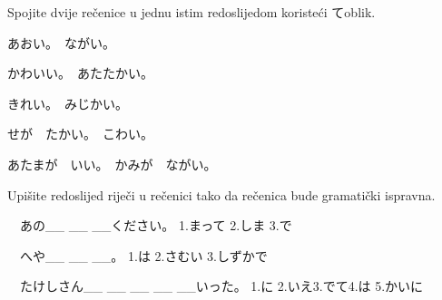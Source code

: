 

\author{Tomislav Mamić}	%


	
	
	\begin{mondai}{Spojite dvije rečenice u jednu istim redoslijedom koristeći てoblik.}
		\item あおい。　ながい。
		\item かわいい。　あたたかい。
		\item きれい。　みじかい。
		\item せが　たかい。　こわい。
		\item あたまが　いい。　かみが　ながい。
	\end{mondai}

	\begin{mondai}{Upišite redoslijed riječi u rečenici tako da rečenica bude gramatički ispravna.
			
			\begin{reibun}[Primjer:]
		\end{reibun} }
		
		\item　あの\_\_ \_\_ \_\_ください。
		\vspace{10pt}
		\newline 1.まって 2.しま 3.で
		\vspace{20pt}
		\item　へや\_\_ \_\_ \_\_。
		\vspace{10pt}
		\newline 1.は 2.さむい 3.しずかで
		\vspace{20pt}
		\item　たけしさん\_\_ \_\_ \_\_ \_\_ \_\_いった。
		\vspace{10pt}
		\newline 1.に 2.いえ3.でて4.は 5.かいに
	\end{mondai}

